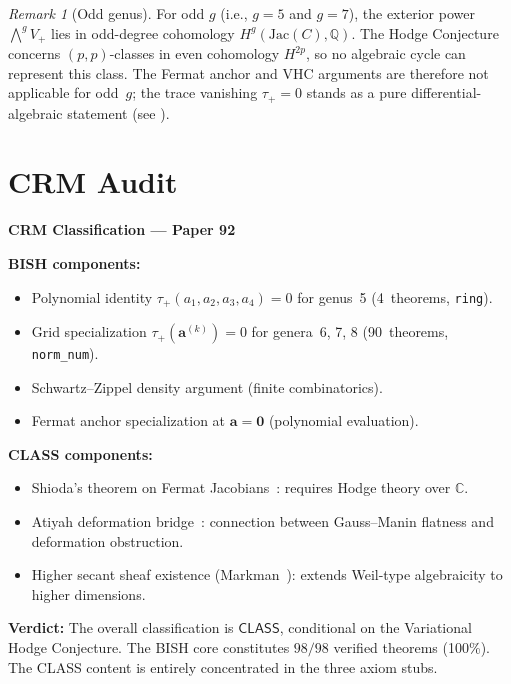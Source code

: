 \documentclass[11pt]{article}
\theoremstyle{plain}
\theoremstyle{definition}
\theoremstyle{remark}
\newtheorem{remark}[theorem]{Remark}
\newcommand{\QQ}{\mathbb{Q}}
\newcommand{\CC}{\mathbb{C}}
\newcommand{\Jac}{\mathrm{Jac}}
\newcommand{\CLASS}{\mathsf{CLASS}}
\begin{document}
\begin{remark}[Odd genus]
For odd $g$ (i.e., $g = 5$ and $g = 7$), the exterior power
$\bigwedge^g V_+$ lies in odd-degree cohomology $H^g(\Jac(C), \QQ)$.
The Hodge Conjecture concerns $(p,p)$-classes in even cohomology $H^{2p}$,
so no algebraic cycle can represent this class.
The Fermat anchor and VHC arguments are therefore not applicable for
odd~$g$; the trace vanishing $\tau_+ = 0$ stands as a pure
differential-algebraic statement (see ).
\end{remark}

\section{CRM Audit}
\label{sec:crm-audit}

\begin{crmbox}
\textbf{CRM Classification --- Paper 92}
\medskip

\noindent\textbf{BISH components:}
\begin{itemize}[nosep]
  \item Polynomial identity $\tau_+(a_1,a_2,a_3,a_4) = 0$ for genus~5
    (4~theorems, \texttt{ring}).
  \item Grid specialization $\tau_+(\mathbf{a}^{(k)}) = 0$ for
    genera~6, 7, 8 (90~theorems, \texttt{norm\_num}).
  \item Schwartz--Zippel density argument (finite combinatorics).
  \item Fermat anchor specialization at $\mathbf{a} = \mathbf{0}$
    (polynomial evaluation).
\end{itemize}

\noindent\textbf{CLASS components:}
\begin{itemize}[nosep]
  \item Shioda's theorem on Fermat Jacobians~\cite{shioda1982}:
    requires Hodge theory over $\CC$.
  \item Atiyah deformation bridge~\cite{atiyah1957}: connection between
    Gauss--Manin flatness and deformation obstruction.
  \item Higher secant sheaf existence (Markman~\cite{markman2025}):
    extends Weil-type algebraicity to higher dimensions.
\end{itemize}

\noindent\textbf{Verdict:} The overall classification is $\CLASS$,
conditional on the Variational Hodge Conjecture.  The BISH core
constitutes $98/98$ verified theorems (100\%).  The CLASS content
is entirely concentrated in the three axiom stubs.
\end{crmbox}
\end{document}
